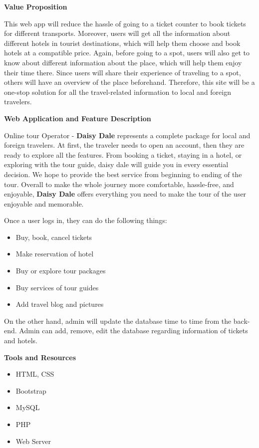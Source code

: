 \documentclass[]{article}
\begin{document}
\textbf{\Large Value Proposition}

This web app will reduce the hassle of going to a ticket counter to book tickets for different transports. Moreover, users will get all the information about different hotels in tourist destinations, which will help them choose and book hotels at a compatible price. Again, before going to a spot, users will also get to know about different information about the place, which will help them enjoy their time there. Since users will share their experience of traveling to a spot, others will have an overview of the place beforehand. Therefore, this site will be a one-stop solution for all the travel-related information to local and foreign travelers.
\newline



\textbf{\Large Web Application and Feature Description}

Online tour Operator - \textbf{Daisy Dale} represents a complete package for local and foreign travelers. At first, the traveler needs to open an account, then they are ready to explore all the features. From booking a ticket, staying in a hotel, or exploring with the tour guide, daisy dale will guide you in every essential decision. We hope to provide the best service from beginning to ending of the tour. Overall to make the whole journey more comfortable, hassle-free, and enjoyable, \textbf{Daisy Dale} offers everything you need to make the tour of the user enjoyable and memorable.


Once a user logs in, they can do the following things:

\begin{itemize}
\item
  Buy, book, cancel tickets
\item
  Make reservation of hotel
\item
  Buy or explore tour packages
\item
  Buy services of tour guides
\item
  Add travel blog and pictures
\end{itemize}

On the other hand, admin will update the database time to time from the back-end. Admin can add, remove, edit the database regarding information
of tickets and hotels.
\newline

\textbf{\Large Tools and Resources}

\begin{itemize}
\item
  HTML, CSS
\item
  Bootstrap
\item
  MySQL
\item
  PHP
\item
  Web Server



\end{itemize}
\end{document}
